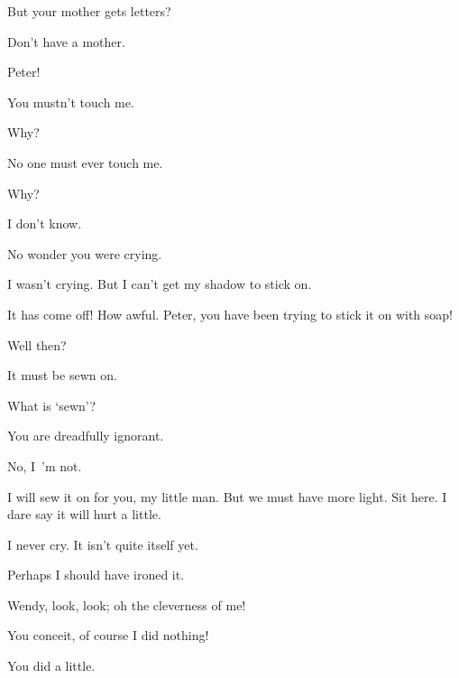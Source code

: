 \begin{drama}
\wendyspeaks
But your mother gets letters?

\peterspeaks
Don’t have a mother.

\wendyspeaks
Peter!


\peterspeaks
You mustn’t touch me.

\wendyspeaks
Why?

\peterspeaks
No one must ever touch me.

\wendyspeaks
Why?

\peterspeaks
I don’t know.


\wendyspeaks
No wonder you were crying.

\peterspeaks
I wasn’t crying.
But I can’t get my shadow to stick on.

\wendyspeaks
It has come off!
How awful.
Peter, you have been trying to stick it on with soap!

Well then?

\wendyspeaks
It must be sewn on.

\peterspeaks
What is ‘sewn’?

\wendyspeaks
You are dreadfully ignorant.

\peterspeaks
No, I~’m not.

\wendyspeaks
I will sew it on for you, my little man.
But we must have more light.
Sit here.
I dare say it will hurt a little.

I never cry.
It isn’t quite itself yet.

\wendyspeaks
Perhaps I should have ironed it.

\peterspeaks
Wendy, look, look; oh the cleverness of me!

\wendyspeaks
You conceit, of course I did nothing!

\peterspeaks
You did a little.


\end{drama}
